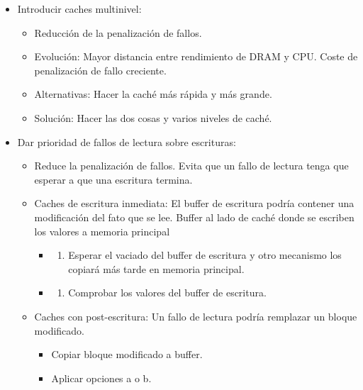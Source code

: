 \documentclass[12pt, twoside, openright]{report} %
\begin{document}
\begin{itemize}

	\item Introducir caches multinivel:

	      \begin{itemize}

		      \item Reducción de la penalización de fallos.
		      \item Evolución: Mayor distancia entre rendimiento de DRAM y CPU. Coste
		            de penalización de fallo creciente.
		      \item Alternativas: Hacer la caché más rápida y más grande.
		      \item Solución: Hacer las dos cosas y varios niveles de caché.
	      \end{itemize}
	      \pagebreak
	\item Dar prioridad de fallos de lectura sobre escrituras:

	      \begin{itemize}

		      \item Reduce la penalización de fallos. Evita que un fallo de lectura
		            tenga que esperar a que una escritura termina.
		      \item Caches de escritura inmediata: El buffer de escritura podría
		            contener una modificación del fato que se lee. Buffer al lado de
		            caché donde se escriben los valores a memoria principal

		            \begin{itemize}
			            \item \begin{enumerate}
				                  \def\labelenumi{\alph{enumi})}

				                  \item Esperar el vaciado del buffer de escritura y otro mecanismo
				                        los copiará más tarde en memoria principal.
			                  \end{enumerate}
			            \item \begin{enumerate}
				                  \def\labelenumi{\alph{enumi})}
				                  \setcounter{enumi}{1}

				                  \item Comprobar los valores del buffer de escritura.
			                  \end{enumerate}
		            \end{itemize}
		      \item Caches con post-escritura: Un fallo de lectura podría remplazar un
		            bloque modificado.

		            \begin{itemize}

			            \item Copiar bloque modificado a buffer.
			            \item Aplicar opciones a o b.
		            \end{itemize}
	      \end{itemize}
\end{itemize}
\end{document}
